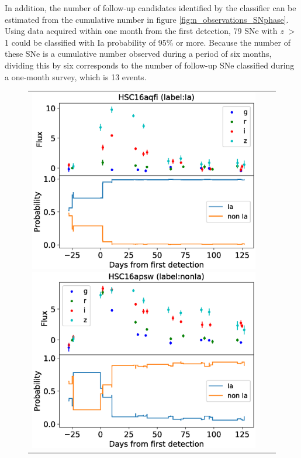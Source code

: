 \documentclass[useamsfonts]{pasj01}
\begin{document}
In addition, the number of follow-up candidates identified by the classifier can be estimated from the cumulative number in figure \ref{fig:n_observations_SNphase}.
Using data acquired within one month from the first detection, 79 SNe with {\it z} $>$ 1 could be classified with Ia probability of 95\% or more.
Because the number of these SNe is a cumulative number observed during a period of six months, dividing this by six corresponds to the number of follow-up SNe classified during a one-month survey, which is 13 events.
%
\begin{figure}[htbp]
    \begin{tabular}{ccc}
        \begin{minipage}{0.33\hsize}
            \begin{center}
                \includegraphics[width=\columnwidth]{figures/lcp_aqfi.eps}
            \end{center}
        \end{minipage}
        \begin{minipage}{0.33\hsize}
            \begin{center}
                \includegraphics[width=\columnwidth]{figures/lcp_apsw.eps}

\end{center}
\end{minipage}
\end{tabular}
\end{figure}
\end{document}
